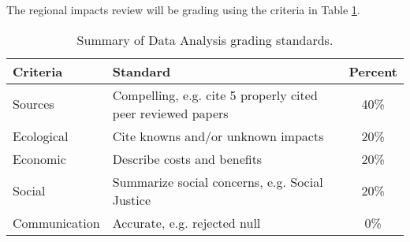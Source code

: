 The regional impacts review will be grading using the criteria in Table \ref{tab:regionalimpactsgrading}.

\begin{table}[h]
\caption{Summary of Data Analysis grading standards.}
\label{tab:regionalimpactsgrading}
\begin{tabular}{llc}\hline
Criteria            &   Standard    & Percent \\ \hline\hline
Sources     & Compelling, e.g. cite 5 properly cited peer reviewed papers & 40\% \\
Ecological  & Cite knowns and/or unknown impacts            & 20\% \\
Economic    & Describe costs and benefits              & 20\% \\
Social      & Summarize social concerns, e.g. Social Justice             & 20\% \\
Communication    & Accurate, e.g. rejected null   & {\color{red}0\%} \\

\hline
\end{tabular}
\end{table}
